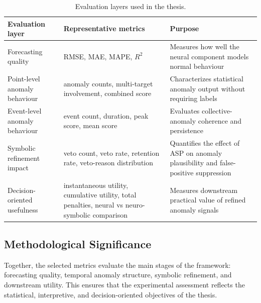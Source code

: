 \begin{table}[H]
	\centering
	\caption{Evaluation layers used in the thesis.}
	\label{tab:evaluation_layers}
	\small
	\begin{tabular}{|p{3.5cm}|p{4.5cm}|p{6.5cm}|}
		\hline
		\textbf{Evaluation layer} & \textbf{Representative metrics} & \textbf{Purpose} \\
		\hline
		Forecasting quality & RMSE, MAE, MAPE, $R^2$ & Measures how well the neural component models normal behaviour \\
		\hline
		Point-level anomaly behaviour & anomaly counts, multi-target involvement, combined score & Characterizes statistical anomaly output without requiring labels \\
		\hline
		Event-level anomaly behaviour & event count, duration, peak score, mean score & Evaluates collective-anomaly coherence and persistence \\
		\hline
		Symbolic refinement impact & veto count, veto rate, retention rate, veto-reason distribution & Quantifies the effect of ASP on anomaly plausibility and false-positive suppression \\
		\hline
		Decision-oriented usefulness & instantaneous utility, cumulative utility, total penalties, neural vs neuro-symbolic comparison & Measures downstream practical value of refined anomaly signals \\
		\hline
	\end{tabular}
\end{table}

\subsection{Methodological Significance}

Together, the selected metrics evaluate the main stages of the framework:
forecasting quality, temporal anomaly structure, symbolic refinement, and
downstream utility. This ensures that the experimental assessment reflects the
statistical, interpretive, and decision-oriented objectives of the thesis.
